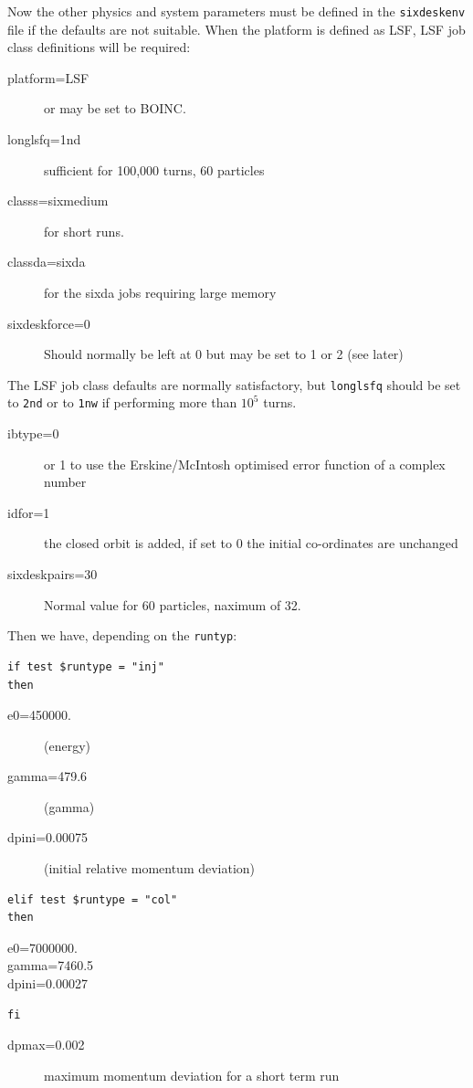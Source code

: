 \documentclass{cernatsnote}    %
\begin{document}
Now the other physics and system parameters must be defined in the
{\tt sixdeskenv} file if the defaults are not suitable.
When the platform is defined as LSF, 
LSF job class definitions will be required:
\begin{description}
\item[platform=LSF] or may be set to BOINC.
\item[longlsfq=1nd] sufficient for 100,000 turns, 60 particles
\item[classs=sixmedium] for short runs.
\item[classda=sixda] for the sixda jobs requiring large memory
\item[sixdeskforce=0] Should normally be left at 0 but may be set to 1 or 2 (see later)
\end{description}
The LSF job class defaults are normally satisfactory, but {\tt longlsfq}
should be set to {\tt 2nd} or to {\tt 1nw} if performing more than $10^5$ turns.

\begin{description}
\item[ibtype=0] or 1 to use the Erskine/McIntosh optimised error function
of a complex number
\item[idfor=1] the closed orbit is added, if set to 0 the initial co-ordinates are unchanged
\item[sixdeskpairs=30] Normal value for 60 particles, naximum of 32. 
\end{description}

Then we have, depending on the {\tt runtyp}:
\begin{verbatim}
if test $runtype = "inj"
then
\end{verbatim}
\begin{description}
\item[e0=450000.] (energy)
\item[gamma=479.6] (gamma)
\item[dpini=0.00075] (initial relative momentum deviation)
\end{description}
\begin{verbatim}
elif test $runtype = "col"
then
\end{verbatim}
\begin{description}
\item[e0=7000000.]
\item[gamma=7460.5]
\item[dpini=0.00027]
\end{description}
\begin{verbatim}
fi
\end{verbatim}
\begin{description}
\item[dpmax=0.002] maximum momentum deviation for a short term run
\end{description}
\end{document}
